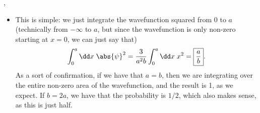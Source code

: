 \begin{example}
    \sep

    \begin{itemize}
        \item This is simple: we just integrate the wavefunction squared from $0$ to $a$ (technically from $-\infty$ to $a$, but since the wavefunction is only non-zero starting at $x=0$, we can just say that)
            \begin{equation}
                \int_0^a \dd x\; \abs{\psi}^2 = \frac{3}{a^2b} \int_0^a \dd x\; x^2 = \boxed{\frac{a}{b}}.
            \end{equation}
            As a sort of confirmation, if we have that $a=b$, then we are integrating over the entire non-zero area of the wavefunction, and the result is 1, as we expect. If $b=2a$, we have that the probability is $1/2$, which also makes sense, as this is just half.
    \end{itemize}
\end{example}
